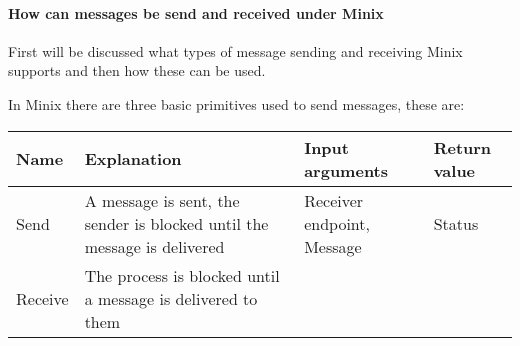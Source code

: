 \hypertarget{how-can-messages-be-send-and-received-under-minix}{%
\paragraph{How can messages be send and received under
Minix}\label{how-can-messages-be-send-and-received-under-minix}}

First will be discussed what types of message sending and receiving
Minix supports and then how these can be used.

In Minix there are three basic primitives used to send messages, these
are:

\begin{longtable}[]{@{}llll@{}}
\toprule
\begin{minipage}[b]{0.11\columnwidth}\raggedright
Name\strut
\end{minipage} & \begin{minipage}[b]{0.23\columnwidth}\raggedright
Explanation\strut
\end{minipage} & \begin{minipage}[b]{0.30\columnwidth}\raggedright
Input arguments\strut
\end{minipage} & \begin{minipage}[b]{0.25\columnwidth}\raggedright
Return value\strut
\end{minipage}\tabularnewline
\midrule
\endhead
\begin{minipage}[t]{0.11\columnwidth}\raggedright
Send\strut
\end{minipage} & \begin{minipage}[t]{0.23\columnwidth}\raggedright
A message is sent, the sender is blocked until the message is
delivered\strut
\end{minipage} & \begin{minipage}[t]{0.30\columnwidth}\raggedright
Receiver endpoint, Message\strut
\end{minipage} & \begin{minipage}[t]{0.25\columnwidth}\raggedright
Status\strut
\end{minipage}\tabularnewline
\begin{minipage}[t]{0.11\columnwidth}\raggedright
Receive\strut
\end{minipage} & \begin{minipage}[t]{0.23\columnwidth}\raggedright
The process is blocked until a message is delivered to them\strut
\end{minipage} & \begin{minipage}[t]{0.30\columnwidth}\raggedright

\end{minipage}
\end{longtable}
